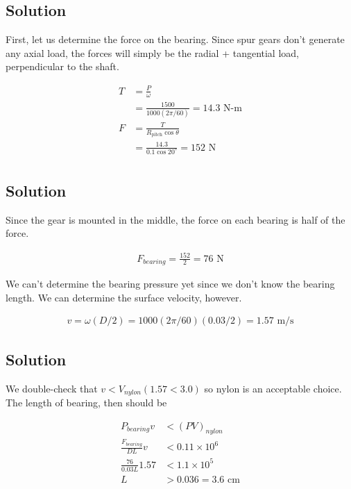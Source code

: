 \documentclass[
10pt,
a4paper,
openany,
svgnames,
]{book}
\begin{document}
\subsection*{Solution}
\label{sec:orgdf72955}

First, let us determine the force on the bearing. Since spur gears don't generate any axial load, the forces will simply be the radial + tangential load, perpendicular to the shaft.

\begin{align*}
    T &= \frac{P}{\omega} \\
      &= \frac{1500}{1000(2\pi / 60)} = 14.3 \text{ N-m} \\
    F &= \frac{T}{R_{\text{pitch}} \cos \theta} \\
      &= \frac{14.3}{0.1 \cos 20^{\circ}} = 152 \text{ N} \\
\end{align*}

\subsection*{Solution}
\label{sec:orgbf73358}

Since the gear is mounted in the middle, the force on each bearing is half of the force.

\begin{align*}
    F_{bearing} = \frac{152}{2} = 76 \text{ N}
\end{align*}

We can't determine the bearing pressure yet since we don't know the bearing length. We can determine the surface velocity, however.

\begin{align*}
    v = \omega (D/2) = 1000 (2\pi / 60) (0.03/2) = 1.57 \text{ m/s}
\end{align*}

\subsection*{Solution}
\label{sec:org15bf95d}

We double-check that \(v < V_{nylon} (1.57 < 3.0)\) so nylon is an acceptable choice. The length of bearing, then should be

\begin{align*}
    P_{bearing}v &< (PV)_{nylon} \\
    \frac{F_{bearing}}{DL}v &< 0.11 \times 10^6 \\
    \frac{76}{0.03L} 1.57 &< 1.1 \times 10^5 \\
    L &> 0.036 = 3.6 \text{ cm}
\end{align*}
\end{document}
